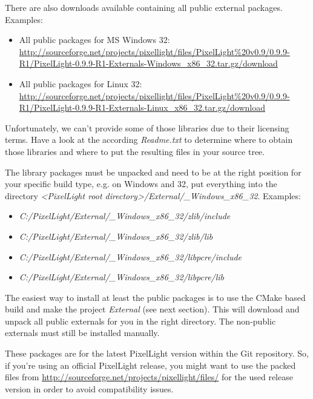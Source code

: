 There are also downloads available containing all public external packages. Examples:
\begin{itemize}
\item{All public packages for \ac{MS} Windows \SI{32}{\bit}: \url{http://sourceforge.net/projects/pixellight/files/PixelLight%20v0.9/0.9.9-R1/PixelLight-0.9.9-R1-Externals-Windows_x86_32.tar.gz/download}}
\item{All public packages for Linux \SI{32}{\bit}: \url{http://sourceforge.net/projects/pixellight/files/PixelLight%20v0.9/0.9.9-R1/PixelLight-0.9.9-R1-Externals-Linux_x86_32.tar.gz/download}}
\end{itemize}

Unfortunately, we can't provide some of those libraries due to their licensing terms. Have a look at the according \emph{Readme.txt} to determine where to obtain those libraries and where to put the resulting files in your source tree.

The library packages must be unpacked and need to be at the right position for your specific build type, e.g. on Windows and \SI{32}{\bit}, put everything into the directory \emph{\textless PixelLight root directory\textgreater /External/\_Windows\_x86\_32}. Examples:
\begin{itemize}
\item{\emph{C:/PixelLight/External/\_Windows\_x86\_32/zlib/include}}
\item{\emph{C:/PixelLight/External/\_Windows\_x86\_32/zlib/lib}}
\item{\emph{C:/PixelLight/External/\_Windows\_x86\_32/libpcre/include}}
\item{\emph{C:/PixelLight/External/\_Windows\_x86\_32/libpcre/lib}}
\end{itemize}

The easiest way to install at least the public packages is to use the CMake based build and make the project \emph{External} (see next section). This will download and unpack all public externals for you in the right directory. The non-public externals must still be installed manually.

These packages are for the latest PixelLight version within the Git repository. So, if you're using an official PixelLight release, you might want to use the packed files from \url{http://sourceforge.net/projects/pixellight/files/} for the used release version in order to avoid compatibility issues.